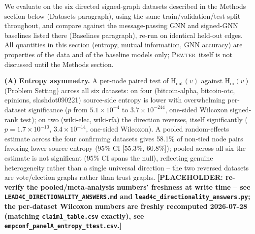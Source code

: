 \documentclass[letterpaper]{article} %
\newcommand{\method}{\textsc{Pewter}\xspace}
\newcommand{\ph}[1]{\textbf{[#1]}}  %
\newcommand{\Hh}{\mathrm{H}}
\newcommand{\indeg}{\mathrm{in}}
\newcommand{\outdeg}{\mathrm{out}}
\theoremstyle{plain}
\theoremstyle{definition}
\begin{document}
We evaluate on the six directed signed-graph datasets described in the Methods section below (Datasets paragraph), using the same train/validation/test split throughout, and compare against the message-passing GNN and signed-GNN baselines listed there (Baselines paragraph), re-run on identical held-out edges. All quantities in this section (entropy, mutual information, GNN accuracy) are properties of the data and of the baseline models only; \method\ itself is not discussed until the Methods section.

\textbf{(A) Entropy asymmetry.} A per-node paired test of $\Hh_\outdeg(v)$ against $\Hh_\indeg(v)$ (Problem Setting) across all six datasets: on four (bitcoin-alpha, bitcoin-otc, epinions, slashdot090221) source-side entropy is lower with overwhelming per-dataset significance ($p$ from $5.1\times10^{-4}$ to $3.7\times10^{-244}$, one-sided Wilcoxon signed-rank test); on two (wiki-elec, wiki-rfa) the direction reverses, itself significantly ($p=1.7\times10^{-10}$, $3.4\times10^{-14}$, one-sided Wilcoxon). A pooled random-effects estimate across the four confirming datasets gives 58.1\% of non-tied node pairs favoring lower source entropy (95\% CI [55.3\%, 60.8\%]); pooled across all six the estimate is not significant (95\% CI spans the null), reflecting genuine heterogeneity rather than a single universal direction -- the two reversed datasets are vote/election graphs rather than trust graphs. \ph{PLACEHOLDER: re-verify the pooled/meta-analysis numbers' freshness at write time -- see \texttt{LEAD4C\_DIRECTIONALITY\_ANSWERS.md} and \texttt{lead4c\_directionality\_answers.py}; the per-dataset Wilcoxon numbers are freshly recomputed 2026-07-28 (matching \texttt{claim1\_table.csv} exactly), see \texttt{empconf\_panelA\_entropy\_ttest.csv}.}
\end{document}
